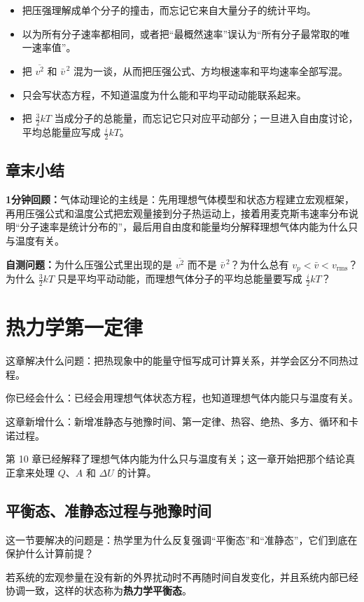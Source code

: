 \documentclass[lang=cn,11pt]{elegantbook}
\newcommand{\bridge}[1]{\begin{note}#1\end{note}}
\newcommand{\chapterroadmap}[3]{%
\begin{introduction}
  \item {\heiti 这章解决什么问题：}#1
  \item {\heiti 你已经会什么：}#2
  \item {\heiti 这章新增什么：}#3
\end{introduction}}
\newcommand{\summaryline}[1]{\par\noindent\textbf{1分钟回顾：}#1\par}
\newcommand{\chapterselfcheck}[1]{\par\noindent\textbf{自测问题：}#1\par}
\begin{document}
\begin{itemize}
  \item 把压强理解成单个分子的撞击，而忘记它来自大量分子的统计平均。
  \item 以为所有分子速率都相同，或者把“最概然速率”误认为“所有分子最常取的唯一速率值”。
  \item 把 \(\overline{v^2}\) 和 \(\bar v^{\,2}\) 混为一谈，从而把压强公式、方均根速率和平均速率全部写混。
  \item 只会写状态方程，不知道温度为什么能和平均平动动能联系起来。
  \item 把 \(\frac32 kT\) 当成分子的总能量，而忘记它只对应平动部分；一旦进入自由度讨论，平均总能量应写成 \(\frac{i}{2}kT\)。
\end{itemize}

\section{章末小结}

\summaryline{气体动理论的主线是：先用理想气体模型和状态方程建立宏观框架，再用压强公式和温度公式把宏观量接到分子热运动上，接着用麦克斯韦速率分布说明“分子速率是统计分布的”，最后用自由度和能量均分解释理想气体内能为什么只与温度有关。}
\chapterselfcheck{为什么压强公式里出现的是 \(\overline{v^2}\) 而不是 \(\bar v^{\,2}\)？为什么总有 \(v_p<\bar v<v_{\mathrm{rms}}\)？为什么 \(\frac32 kT\) 只是平均平动动能，而理想气体分子的平均总能量要写成 \(\frac{i}{2}kT\)？}

\chapter{热力学第一定律}

\chapterroadmap
{把热现象中的能量守恒写成可计算关系，并学会区分不同热过程。}
{已经会用理想气体状态方程，也知道理想气体内能只与温度有关。}
{新增准静态与弛豫时间、第一定律、热容、绝热、多方、循环和卡诺过程。}

\bridge{第 10 章已经解释了理想气体内能为什么只与温度有关；这一章开始把那个结论真正拿来处理 \(Q\)、\(A\) 和 \(\Delta U\) 的计算。}

\section{平衡态、准静态过程与弛豫时间}

这一节要解决的问题是：热学里为什么反复强调“平衡态”和“准静态”，它们到底在保护什么计算前提？

\begin{definition}[热力学平衡态]
若系统的宏观参量在没有新的外界扰动时不再随时间自发变化，并且系统内部已经协调一致，这样的状态称为\textbf{热力学平衡态}。
\end{definition}
\end{document}
